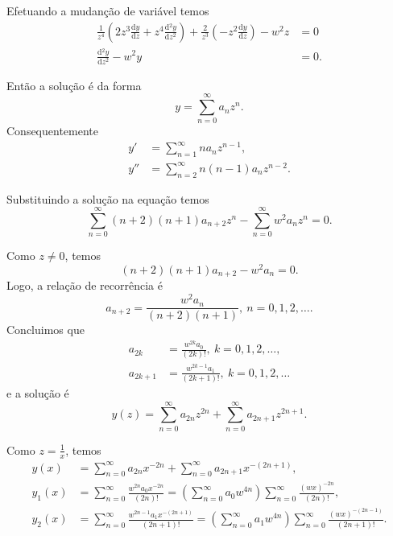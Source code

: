 \documentclass[a4paper,12pt, leqno, answers]{exam}
\newcommand{\devd}[2]{\frac{\text{d} #1}{\text{d} #2}}
\newcommand{\devdt}[2]{\frac{\text{d$^2$} #1}{\text{d} #2^2}}
\begin{document}
\begin{questions}
\begin{solution}
        Efetuando a mudan\c{c}\~{a}o de vari\'{a}vel temos
        \begin{align*}
            \frac{1}{z^4} \left( 2 z^3 \devd{y}{z} + z^4 \devdt{y}{z} \right) + \frac{2}{z^3} \left( - z^2 \devd{y}{z} \right) - w^2 z &= 0 \\
            \devdt{y}{z} - w^2 y &= 0.
        \end{align*}

        Ent\~{a}o a solu\c{c}\~{a}o \'{e} da forma
        \[
        y = \sum_{n = 0}^\infty a_n z^n.
        \]
        Consequentemente
        \begin{align*}
            y' &= \sum_{n = 1}^\infty n a_n z^{n - 1}, \\
            y'' &= \sum_{n = 2}^\infty n \left( n - 1 \right) a_n z^{n - 2}.
        \end{align*}

        Substituindo a solu\c{c}\~{a}o na equa\c{c}\~{a}o temos
        \[
        \sum_{n = 0}^\infty \left( n + 2 \right) \left( n + 1 \right) a_{n + 2} z^n - \sum_{n = 0}^\infty w^2 a_n z^n = 0.
        \]

        Como $z \neq 0$, temos
        \[
        \left( n + 2 \right) \left( n + 1 \right) a_{n + 2} - w^2 a_n = 0.
        \]
        Logo, a rela\c{c}\~{a}o de recorr\^{e}ncia \'{e}
        \[
        a_{n + 2} = \frac{w^2 a_n}{\left( n + 2 \right) \left( n + 1 \right)}, \ n = 0, 1, 2, \ldots.
        \]
        Concluimos que
        \begin{align*}
            a_{2k} &= \frac{w^{2k} a_0}{\left( 2k \right)!}, \ k = 0, 1, 2, \ldots, \\
            a_{2k + 1} &= \frac{w^{2 k - 1} a_1}{\left( 2k + 1 \right)!}, \ k = 0, 1, 2, \ldots
        \end{align*}
        e a solu\c{c}\~{a}o \'{e}
        \[
        y(z) = \sum_{n = 0}^\infty a_{2n} z^{2n} + \sum_{n = 0}^\infty a_{2n + 1} z^{2n + 1}.
        \]

        Como $z = \frac{1}{x}$, temos
        \begin{align*}
            y(x) &= \sum_{n = 0}^\infty a_{2n} x^{-2n} + \sum_{n = 0}^\infty a_{2n + 1} x^{-\left( 2n + 1 \right)}, \\
            y_1(x) &= \sum_{n = 0}^\infty \frac{w^{2n} a_0 x^{-2n}}{\left( 2n \right)!} = \left( \sum_{n = 0}^\infty a_0 w^{4n} \right) \sum_{n = 0}^\infty \frac{\left( w x \right)^{-2n}}{\left( 2n \right)!}, \\
            y_2(x) &= \sum_{n = 0}^\infty \frac{w^{2n - 1} a_1 x^{-\left( 2n + 1 \right)}}{\left( 2n + 1 \right)!} = \left( \sum_{n = 0}^\infty a_1 w^{4n} \right) \sum_{n = 0}^\infty \frac{\left( w x \right)^{-\left( 2n - 1 \right)}}{\left( 2n + 1 \right)!}.
        \end{align*}
    \end{solution}


\end{questions}
\end{document}
